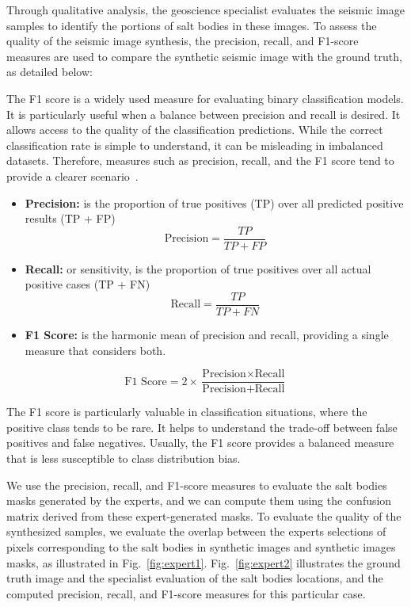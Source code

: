 ﻿\documentclass{ieeeaccess}
\begin{document}
Through qualitative analysis, the geoscience specialist evaluates the seismic image samples to identify the portions of salt bodies in these images. To assess the quality of the seismic image synthesis, the precision, recall, and F1-score measures are used to compare the synthetic seismic image with the ground truth, as detailed below:

The F1 score is a widely used measure for evaluating binary classification models. It is particularly useful when a balance between precision and recall is desired. It allows access to the quality of the classification predictions. While the correct classification rate is simple to understand, it can be misleading in imbalanced datasets. Therefore, measures such as precision, recall, and the F1 score tend to provide a clearer scenario~\cite{Powers2011}.

\begin{itemize}
    \item \textbf{Precision:} is the proportion of true positives (TP) over all predicted positive results (TP + FP)
    \begin{equation}
    \text{Precision} = \frac{TP}{TP + FP}
    \end{equation}

    \item \textbf{Recall:} or sensitivity, is the proportion of true positives over all actual positive cases (TP + FN)
    \begin{equation}
    \text{Recall} = \frac{TP}{TP + FN}
    \end{equation}

    \item \textbf{F1 Score:} is the harmonic mean of precision and recall, providing a single measure that considers both. 

\end{itemize}
    \begin{equation}
    \text{F1 Score} = 2 \times \frac{\text{Precision} \times \text{Recall}}{\text{Precision} + \text{Recall}}
    \end{equation}

The F1 score is particularly valuable in classification situations, where the positive class tends to be rare. It helps to understand the trade-off between false positives and false negatives. Usually, the F1 score provides a balanced measure that is less susceptible to class distribution bias.

We use the precision, recall, and F1-score measures to evaluate the salt bodies masks generated by the experts, and we can compute them using the confusion matrix derived from these expert-generated masks. To evaluate the quality of the synthesized samples, we evaluate the overlap between the experts selections of pixels corresponding to the salt bodies in synthetic images and synthetic images masks, as illustrated in Fig.~\ref{fig:expert1}. Fig.~\ref{fig:expert2} illustrates the ground truth image and the specialist evaluation of the salt bodies locations, and the computed precision, recall, and F1-score measures for this particular case.
\end{document}
